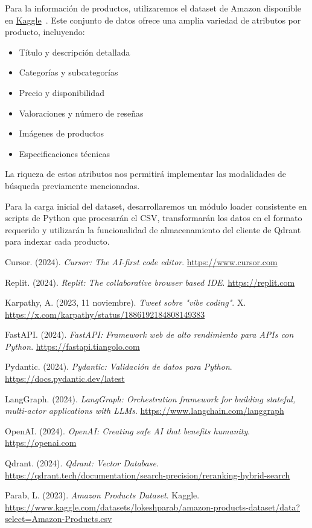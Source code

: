 \documentclass[12pt]{article}
\begin{document}
Para la información de productos, utilizaremos el dataset de Amazon disponible en \href{https://www.kaggle.com/datasets/lokeshparab/amazon-products-dataset/data?select=Amazon-Products.csv}{Kaggle}~\cite{Amazon}. Este conjunto de datos ofrece una amplia variedad de atributos por producto, incluyendo:

\begin{itemize}
    \item Título y descripción detallada
    \item Categorías y subcategorías
    \item Precio y disponibilidad
    \item Valoraciones y número de reseñas
    \item Imágenes de productos
    \item Especificaciones técnicas
\end{itemize}

La riqueza de estos atributos nos permitirá implementar las modalidades de búsqueda previamente mencionadas.

Para la carga inicial del dataset, desarrollaremos un módulo loader consistente en scripts de Python que procesarán el CSV, transformarán los datos en el formato requerido y utilizarán la funcionalidad de almacenamiento del cliente de Qdrant para indexar cada producto.

\newpage

\begin{thebibliography}{2}
    \raggedright

    Cursor. (2024). \textit{Cursor: The AI-first code editor}. \url{https://www.cursor.com}

    Replit. (2024). \textit{Replit: The collaborative browser based IDE}. \url{https://replit.com}

    Karpathy, A. (2023, 11 noviembre). \textit{Tweet sobre "vibe coding"}. X. \url{https://x.com/karpathy/status/1886192184808149383}

    FastAPI. (2024). \textit{FastAPI: Framework web de alto rendimiento para APIs con Python}. \url{https://fastapi.tiangolo.com}

    Pydantic. (2024). \textit{Pydantic: Validación de datos para Python}. \url{https://docs.pydantic.dev/latest}

    LangGraph. (2024). \textit{LangGraph: Orchestration framework for building stateful, multi-actor applications with LLMs}. \url{https://www.langchain.com/langgraph}

    OpenAI. (2024). \textit{OpenAI: Creating safe AI that benefits humanity}. \url{https://openai.com}

    Qdrant. (2024). \textit{Qdrant: Vector Database}. \url{https://qdrant.tech/documentation/search-precision/reranking-hybrid-search}

    Parab, L. (2023). \textit{Amazon Products Dataset}. Kaggle. \url{https://www.kaggle.com/datasets/lokeshparab/amazon-products-dataset/data?select=Amazon-Products.csv}

\end{thebibliography}
\end{document}
